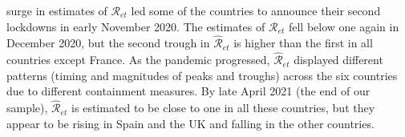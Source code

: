 \documentclass[12pt]{article}
\begin{document}
surge in estimates of $\mathcal{R}_{et}$ led some of the countries to announce
their second lockdowns in early November 2020. The estimates of $\mathcal{R}%
_{et}$ fell below one again in December 2020, but the second trough in
$\mathcal{\hat{R}}_{et}$ is higher than the first in all countries except
France. As the pandemic progressed, $\mathcal{\hat{R}}_{et}$ displayed
different patterns (timing and magnitudes of peaks and troughs) across the six
countries due to different containment measures. By late April 2021 (the end
of our sample), $\mathcal{\hat{R}}_{et}$ is estimated to be close to one in
all these countries, but they appear to be rising in Spain and the UK and
falling in the other countries.%

\end{document}
